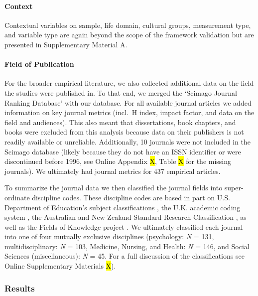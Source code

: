 \paragraph{Context}

Contextual variables on sample, life domain, cultural groups,
measurement type, and variable type are again beyond the scope of the
framework validation but are presented in Supplementary Material A.

\paragraph{Field of Publication}

For the broader empirical literature, we also collected additional data
on the field the studies were published in. To that end, we merged the
`Scimago Journal Ranking Database' \citep{SCImago2020} with our
database. For all available journal articles we added information on key
journal metrics (incl.~H index, impact factor, and data on the field and
audiences). This also meant that dissertations, book chapters, and books
were excluded from this analysis because data on their publishers is not
readily available or unreliable. Additionally, 10 journals were not
included in the Scimago database (likely because they do not have an
ISSN identifier or were discontinued before 1996, see Online Appendix
\hl{X}, Table \hl{X} for the missing journals). We ultimately had
journal metrics for 437 empirical articles.

To summarize the journal data we then classified the journal fields into
super-ordinate discipline codes. These discipline codes are based in
part on U.S. Department of Education's subject classifications
\citep[i.e., CIP;][]{InstituteofEducationSciences2020}, the U.K.
academic coding system
\citep[JACS 3.0;][]{HigherEducationStatisticsAgency2013}, the Australian
and New Zealand Standard Research Classification
\citep[ANZSRC 2020;][]{AustralianBureauofStatistics2020}, as well as the
Fields of Knowledge project \citep{ThingsmadeThinkable2014}. We
ultimately classified each journal into one of four mutually exclusive
disciplines (psychology: \textit{N} = 131, multidisciplinary: \textit{N}
= 103, Medicine, Nursing, and Health: \textit{N} = 146, and Social
Sciences (miscellaneous): \textit{N} = 45. For a full discussion of the
classifications see Online Supplementary Materials \hl{X}).

\subsubsection{Results}

